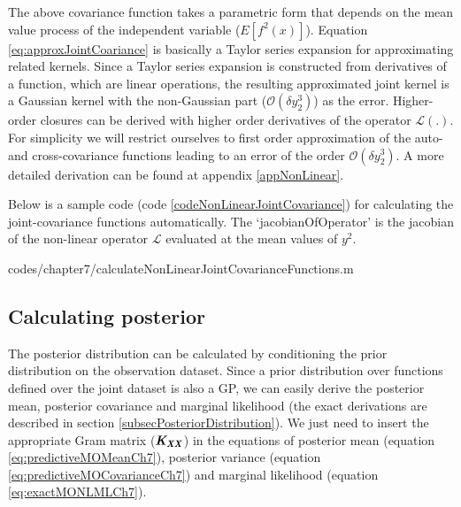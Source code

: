 The above covariance function takes a parametric form that depends on the mean value process of the independent variable ($E[f^2(x)]$). Equation \ref{eq:approxJointCoariance} is basically a Taylor series expansion for approximating related kernels. Since a Taylor series expansion is constructed from derivatives of a function, which are linear operations, the resulting approximated joint kernel is a Gaussian kernel with the non-Gaussian part ($\mathcal{O}\left ( \delta y_{2}^{3} \right )$) as the error. Higher-order closures can be derived with higher order derivatives of the operator \(\mathcal{L}(.)\). For simplicity we will restrict ourselves to first order approximation of the auto- and cross-covariance functions leading to an error of the order \(\mathcal{O}\left ( \delta y_{2}^{3} \right )\).  A more detailed derivation can be found at appendix \ref{appNonLinear}. 

Below is a sample code (code \ref{codeNonLinearJointCovariance}) for calculating the joint-covariance functions automatically. The `jacobianOfOperator' is the jacobian of the non-linear operator $\mathcal{L}$ evaluated at the mean values of $y^2$.

\begin{mdframed}[hidealllines=true,backgroundcolor=lightgray!20]
            {codes/chapter7/calculateNonLinearJointCovarianceFunctions.m}
\end{mdframed}

\subsection{Calculating posterior}\label{sub:MOGPs}
The posterior distribution can be calculated by conditioning the prior distribution on the observation dataset. Since a prior distribution over functions defined over the joint dataset is also a GP, we can easily derive the posterior mean, posterior covariance and marginal likelihood (the exact derivations are described in section \ref{subsecPosteriorDistribution}). We just need to insert the appropriate Gram matrix ($\bm{\mathit{K_{XX}}}$) in the equations of posterior mean (equation \ref{eq:predictiveMOMeanCh7}), posterior variance (equation \ref{eq:predictiveMOCovarianceCh7}) and marginal likelihood (equation \ref{eq:exactMONLMLCh7}). 

